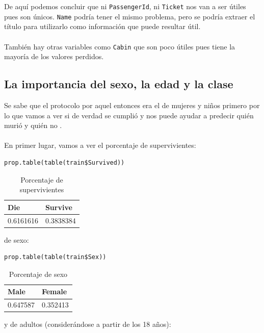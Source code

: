 De aquí podemos concluir que ni \texttt{PassengerId}, ni \texttt{Ticket} nos van a ser útiles pues son únicos. \texttt{Name} podría tener el mismo problema, pero se podría extraer el título para utilizarlo como información que puede resultar útil.
\\ \\
También hay otras variables como \texttt{Cabin} que son poco útiles pues tiene la mayoría de los valores perdidos.

\subsection{La importancia del sexo, la edad y la clase}

Se sabe que el protocolo por aquel entonces era el de mujeres y niños primero por lo que vamos a ver si de verdad se cumplió y nos puede ayudar a predecir quién murió y quién no \cite{TrevorStephensTutorial}.
\\ \\
En primer lugar, vamos a ver el porcentaje de supervivientes:

\begin{lstlisting}[style=R]
prop.table(table(train$Survived))
\end{lstlisting}

\begin{table}[H]
	\centering
	\caption{Porcentaje de supervivientes}
	\label{tab:die-survive}
	\begin{tabular}{|ll|}
		\hline
		Die       & Survive   \\ \hline
		0.6161616 & 0.3838384 \\ \hline
	\end{tabular}
\end{table}

de sexo:

\begin{lstlisting}[style=R]
prop.table(table(train$Sex))
\end{lstlisting}

\begin{table}[H]
	\centering
	\caption{Porcentaje de sexo}
	\label{tab:male-female}
	\begin{tabular}{|ll|}
		\hline
		Male     & Female   \\ \hline
		0.647587 & 0.352413 \\ \hline
	\end{tabular}
\end{table}

y de adultos (considerándose a partir de los 18 años):

